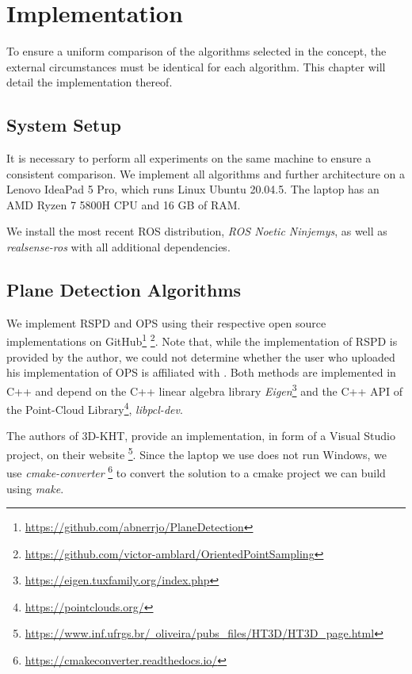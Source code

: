 \documentclass[main.tex]{subfiles}
\begin{document}
\chapter{Implementation}
To ensure a uniform comparison of the algorithms selected in the concept, the external circumstances
must be identical for each algorithm. This chapter will detail the implementation thereof.

\section{System Setup}
It is necessary to perform all experiments on the same machine to ensure a consistent comparison.
We implement all algorithms and further architecture on a Lenovo IdeaPad 5 Pro,
which runs Linux Ubuntu 20.04.5. The laptop has an AMD Ryzen 7 5800H CPU and 16 GB of RAM.

We install the most recent ROS distribution, \textit{ROS Noetic Ninjemys}, as well as \textit{realsense-ros} with all additional dependencies.


\section{Plane Detection Algorithms}
We implement RSPD and OPS using their respective open source implementations on GitHub\footnote{\href{https://github.com/abnerrjo/PlaneDetection}{{https://github.com/abnerrjo/PlaneDetection}}}
\footnote{\href{https://github.com/victor-amblard/OrientedPointSampling}{https://github.com/victor-amblard/OrientedPointSampling}}. Note that, while the implementation of RSPD is provided by the author,
we could not determine whether the user who uploaded his implementation of OPS is affiliated with \citeauthor{Sun_Mordohai_2019}.
Both methods are implemented in C++ and depend on the C++ linear algebra library \textit{Eigen}\footnote{\href{https://eigen.tuxfamily.org/index.php}{https://eigen.tuxfamily.org/index.php}}
and the C++ API of the  Point-Cloud Library\footnote{\href{https://pointclouds.org/}{https://pointclouds.org/}}, \textit{libpcl-dev}.

The authors of 3D-KHT, provide an implementation, in form of a Visual Studio project, on their website \footnote{\href{https://www.inf.ufrgs.br/~oliveira/pubs_files/HT3D/HT3D_page.html}
    {https://www.inf.ufrgs.br/~oliveira/pubs\_files/HT3D/HT3D\_page.html}}. Since the laptop we use does not run Windows, we use \textit{cmake-converter}
\footnote{\href{https://cmakeconverter.readthedocs.io/en/latest/use.html}{https://cmakeconverter.readthedocs.io/}} to convert
the solution to a cmake project we can build using \textit{make}.
\end{document}
